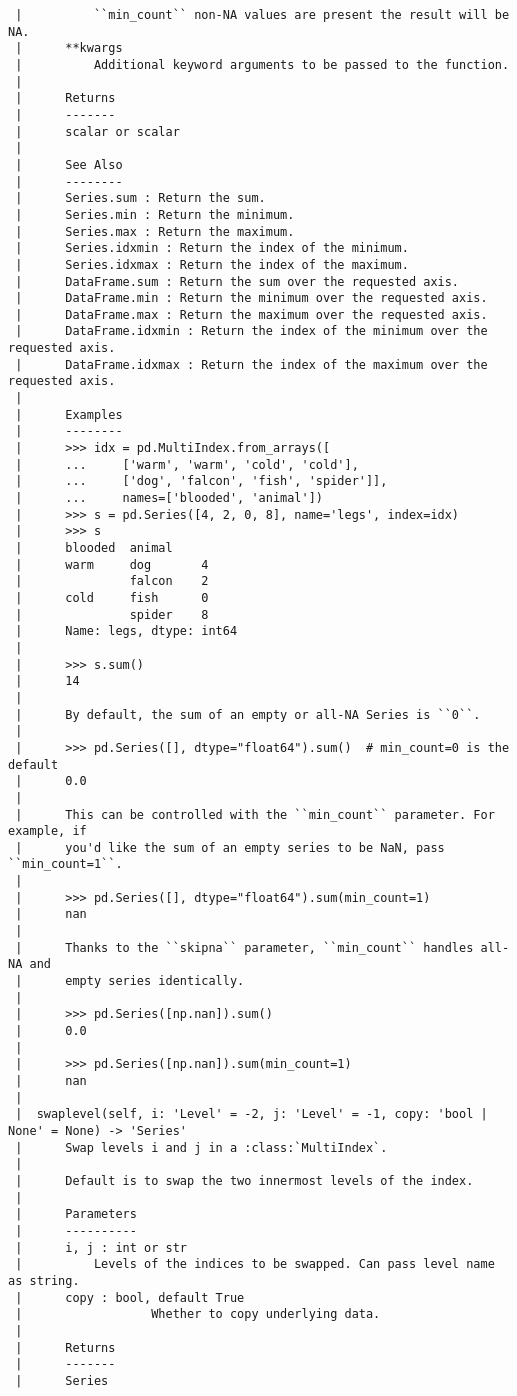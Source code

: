 \documentclass[
  letterpaper,
  DIV=11,
  numbers=noendperiod]{scrreprt}
\begin{document}
\begin{verbatim}
 |          ``min_count`` non-NA values are present the result will be NA.
 |      **kwargs
 |          Additional keyword arguments to be passed to the function.
 |      
 |      Returns
 |      -------
 |      scalar or scalar
 |      
 |      See Also
 |      --------
 |      Series.sum : Return the sum.
 |      Series.min : Return the minimum.
 |      Series.max : Return the maximum.
 |      Series.idxmin : Return the index of the minimum.
 |      Series.idxmax : Return the index of the maximum.
 |      DataFrame.sum : Return the sum over the requested axis.
 |      DataFrame.min : Return the minimum over the requested axis.
 |      DataFrame.max : Return the maximum over the requested axis.
 |      DataFrame.idxmin : Return the index of the minimum over the requested axis.
 |      DataFrame.idxmax : Return the index of the maximum over the requested axis.
 |      
 |      Examples
 |      --------
 |      >>> idx = pd.MultiIndex.from_arrays([
 |      ...     ['warm', 'warm', 'cold', 'cold'],
 |      ...     ['dog', 'falcon', 'fish', 'spider']],
 |      ...     names=['blooded', 'animal'])
 |      >>> s = pd.Series([4, 2, 0, 8], name='legs', index=idx)
 |      >>> s
 |      blooded  animal
 |      warm     dog       4
 |               falcon    2
 |      cold     fish      0
 |               spider    8
 |      Name: legs, dtype: int64
 |      
 |      >>> s.sum()
 |      14
 |      
 |      By default, the sum of an empty or all-NA Series is ``0``.
 |      
 |      >>> pd.Series([], dtype="float64").sum()  # min_count=0 is the default
 |      0.0
 |      
 |      This can be controlled with the ``min_count`` parameter. For example, if
 |      you'd like the sum of an empty series to be NaN, pass ``min_count=1``.
 |      
 |      >>> pd.Series([], dtype="float64").sum(min_count=1)
 |      nan
 |      
 |      Thanks to the ``skipna`` parameter, ``min_count`` handles all-NA and
 |      empty series identically.
 |      
 |      >>> pd.Series([np.nan]).sum()
 |      0.0
 |      
 |      >>> pd.Series([np.nan]).sum(min_count=1)
 |      nan
 |  
 |  swaplevel(self, i: 'Level' = -2, j: 'Level' = -1, copy: 'bool | None' = None) -> 'Series'
 |      Swap levels i and j in a :class:`MultiIndex`.
 |      
 |      Default is to swap the two innermost levels of the index.
 |      
 |      Parameters
 |      ----------
 |      i, j : int or str
 |          Levels of the indices to be swapped. Can pass level name as string.
 |      copy : bool, default True
 |                  Whether to copy underlying data.
 |      
 |      Returns
 |      -------
 |      Series

\end{verbatim}
\end{document}

